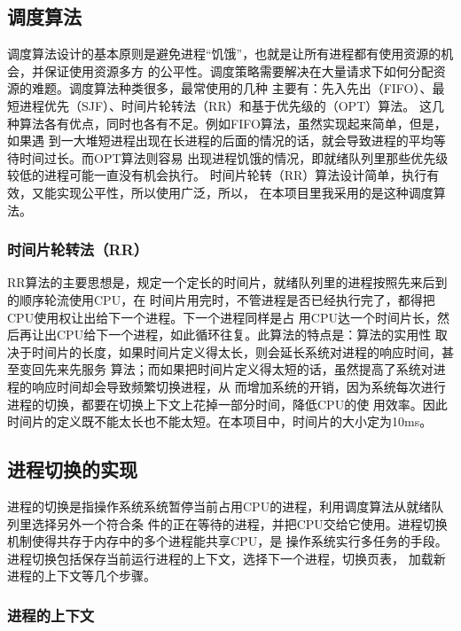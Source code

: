\documentclass{swfcthesismscctex}
\begin{document}
\subsection{调度算法}

调度算法设计的基本原则是避免进程“饥饿”，也就是让所有进程都有使用资源的机会，并保证使用资源多方
的公平性。调度策略需要解决在大量请求下如何分配资源的难题。调度算法种类很多，最常使用的几种
主要有：先入先出（FIFO）、最短进程优先（SJF）、时间片轮转法（RR）和基于优先级的（OPT）算法。
这几种算法各有优点，同时也各有不足。例如FIFO算法，虽然实现起来简单，但是，如果遇
到一大堆短进程出现在长进程的后面的情况的话，就会导致进程的平均等待时间过长。而OPT算法则容易
出现进程饥饿的情况，即就绪队列里那些优先级较低的进程可能一直没有机会执行。%
时间片轮转（RR）算法设计简单，执行有效，又能实现公平性，所以使用广泛，所以，
在本项目里我采用的是这种调度算法。

\subsubsection{时间片轮转法（RR）}

RR算法的主要思想是，规定一个定长的时间片，就绪队列里的进程按照先来后到的顺序轮流使用CPU，在
时间片用完时，不管进程是否已经执行完了，都得把CPU使用权让出给下一个进程。下一个进程同样是占
用CPU达一个时间片长，然后再让出CPU给下一个进程，如此循环往复。此算法的特点是：算法的实用性
取决于时间片的长度，如果时间片定义得太长，则会延长系统对进程的响应时间，甚至变回先来先服务
算法；而如果把时间片定义得太短的话，虽然提高了系统对进程的响应时间却会导致频繁切换进程，从
而增加系统的开销，因为系统每次进行进程的切换，都要在切换上下文上花掉一部分时间，降低CPU的使
用效率。因此时间片的定义既不能太长也不能太短。在本项目中，时间片的大小定为10ms。

\subsection{进程切换的实现}

进程的切换是指操作系统系统暂停当前占用CPU的进程，利用调度算法从就绪队列里选择另外一个符合条
件的正在等待的进程，并把CPU交给它使用。进程切换机制使得共存于内存中的多个进程能共享CPU，是
操作系统实行多任务的手段。进程切换包括保存当前运行进程的上下文，选择下一个进程，切换页表，
加载新进程的上下文等几个步骤。

\subsubsection{进程的上下文}
\end{document}
